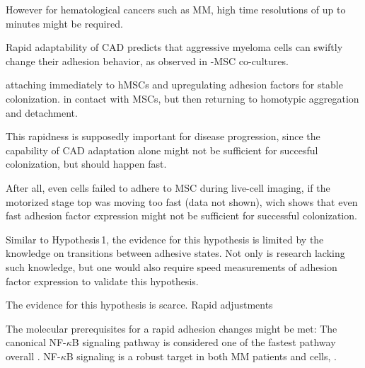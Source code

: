 However for hematological cancers such as MM, high time resolutions of up to minutes
might be required.




Rapid adaptability of \ac{CAD} predicts that aggressive myeloma cells can
swiftly change their adhesion behavior, as observed in \INA-\ac{MSC} co-cultures.

attaching
immediately to hMSCs and upregulating adhesion factors for stable colonization.
in contact with
\acp{MSC}, but then returning to homotypic aggregation and detachment.

This
rapidness is supposedly important for disease progression, since the capability
of \ac{CAD} adaptation  alone might not be sufficient for succesful
colonization, but should happen fast.

After all, even
\INA cells failed to adhere to \ac{MSC} during live-cell imaging, if the
motorized stage top was moving too fast (data not shown), wich shows that even
fast adhesion factor expression might not be sufficient for successful
colonization.

Similar to Hypothesis\,1, the evidence for this hypothesis is limited by
the knowledge on transitions between adhesive states. Not only is research lacking
such knowledge, but one would also require speed measurements of adhesion factor
expression to validate this hypothesis.

The
evidence for this hypothesis is scarce.
Rapid adjustments



The molecular prerequisites  for a rapid adhesion changes might be met:
The
canonical NF-$\kappa$B signaling pathway is considered one of the fastest
pathway overall \cite{gallego-sellesFastRegulationNFkB2022,
      zarnegarNoncanonicalNFkBActivation2008}. NF-$\kappa$B signaling is a
robust target in both MM patients and \INA cells,
\cite{sarinEvaluatingEfficacyMultiple2020}.



